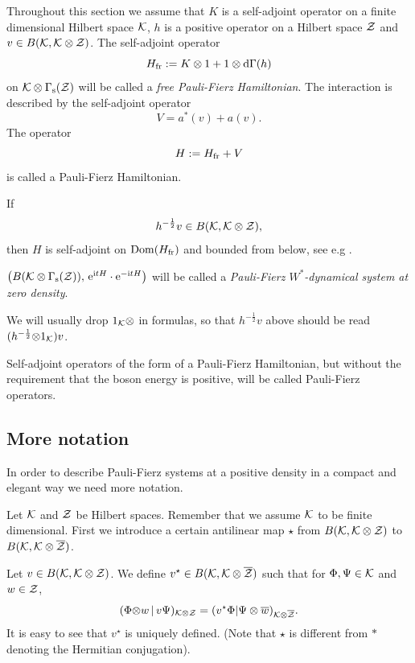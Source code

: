 \documentclass{svmult}
\newcommand{\beq}{\begin{equation}}
\newcommand{\eeq}{\end{equation}}
\def\bar{\overline}
\def\s{{\rm s}}
\def\12{{\frac12}}
\def\cZ{{\cal Z}}
\def\cB{{ B}}
\def\i{{\rm i}}
\def\Dom{{\rm Dom}}
\def\12{\frac{1}{2}}
\def\e{{\rm e}}
\def\d{{\rm d}}
\def\one{{\bf 1}}
\def\cK{{\cal K}}
\def\12{\frac{1}{2}}
\def\e{{\rm e}}
\def\d{{\rm d}}
\def\one{{ 1}}
\def\fr{{\rm fr}}
\def\s{{\rm s}}
\begin{document}
Throughout this section we assume that $K$ is a self-adjoint operator on a
finite dimensional 
Hilbert space $\cK$, $h$ is a positive operator on a Hilbert space
$\cZ$ and $v\in \cB(\cK,\cK\otimes\cZ)$. 
The self-adjoint operator  
\[H_\fr:=K\otimes1+1\otimes\d\Gamma(h)\]
on $\cK\otimes\Gamma_\s(\cZ)$
 will be called a {\em free Pauli-Fierz Hamiltonian}. The
interaction is described by  the self-adjoint operator
\[ V= a^*(v) + a(v).\]
The operator
\[H:=H_\fr+ V\]
 is called a Pauli-Fierz Hamiltonian.




If
\beq \label{posi1} 
h^{-\12}v\in \cB(\cK,\cK\otimes\cZ),
\eeq
then $H$ is 
self-adjoint on $\Dom(H_\fr)$ and bounded from below, see e.g \cite{DJ2}.



 $\bigl(B(\cK\otimes\Gamma_\s(\cZ)),\,\e^{\i t H}\cdot\e^{-\i t H}\bigl)$
will be called a {\em Pauli-Fierz $W^*$-dynamical system at zero density}.


\begin{remark}
We will usually drop $\one_\cK\otimes$ in formulas, so that
$h^{-\12}v$ above should be read $(h^{-\12}{\otimes}\one_\cK)v$.
\end{remark}

\begin{remark} Self-adjoint operators of the form of a Pauli-Fierz Hamiltonian,
 but without
 the requirement
 that the boson energy is positive, will be called Pauli-Fierz operators.
\end{remark}


\subsection{More notation}

In order to describe  Pauli-Fierz systems  at a positive density
in a compact and elegant way
 we need more
notation. 



Let $\cK$ and $\cZ$ be Hilbert spaces. Remember that we assume $\cK$ to be
 finite dimensional.
 First  we
introduce a certain antilinear map $\star$ from 
 $\cB(\cK,\cK\otimes\cZ)$ to 
$\cB(\cK,\cK\otimes\bar\cZ)$. 

Let $v\in \cB(\cK,\cK\otimes\cZ)$. We define
 $v^\star \in B(\cK,\cK\otimes\bar\cZ)$ such that for 
$\Phi, \Psi \in \cK$ and $w \in \cZ$, 
\[(\Phi{\otimes} w\,|\,v\Psi)_{\cK\otimes\cZ}
=(v^\star\Phi|\Psi\otimes\bar w)_{\cK\otimes\bar\cZ}.\]
It is easy to see that  $v^\star$ is  uniquely defined. 
(Note that $\star$ is different from $*$ denoting the Hermitian 
conjugation).
\end{document}
